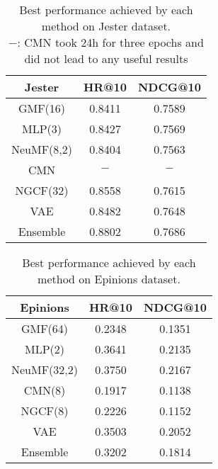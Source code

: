 \begin{table}[h]
    \centering
    \begin{tabular}{c|c|c}
        \hline
        Jester & HR@10 & NDCG@10 \\
        \hline
        GMF(16)    & 0.8411 & 0.7589 \\
        MLP(3)     & 0.8427 & 0.7569 \\
        NeuMF(8,2) & 0.8404 & 0.7563 \\
        CMN        & $-$ & $-$ \\
        NGCF(32)   & 0.8558	& 0.7615 \\
        VAE        & 0.8482 & 0.7648 \\
        Ensemble   & 0.8802 & 0.7686
    \end{tabular}
    \caption{Best performance achieved by each method on Jester dataset.\\
    {\scriptsize $-$: CMN took 24h for three epochs and did not lead to any useful results}}
    \label{tab:jester}
\end{table}
\begin{table}[h]
    \centering
    \begin{tabular}{c|c|c}
        \hline
        Epinions & HR@10 & NDCG@10 \\
        \hline
        GMF(64)     & 0.2348 & 0.1351 \\
        MLP(2)      & 0.3641 & 0.2135 \\
        NeuMF(32,2) & 0.3750 & 0.2167 \\
        CMN(8)         & 0.1917 & 0.1138  \\
        NGCF(8)     & 0.2226 & 0.1152 \\
        VAE         & 0.3503 & 0.2052 \\
        Ensemble    & 0.3202 & 0.1814
    \end{tabular}
    \caption{Best performance achieved by each method on Epinions dataset.}
    \label{tab:epinions}
\end{table}


